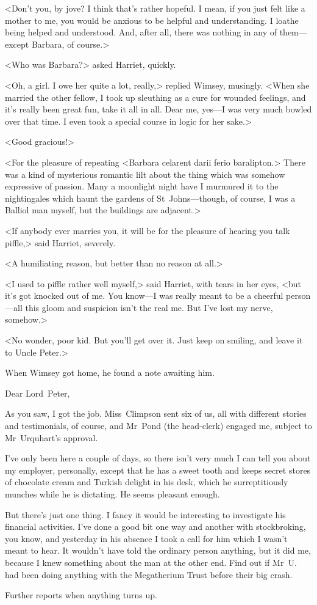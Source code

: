 <Don't you, by jove? I think that's rather hopeful. I mean, if you just felt like a mother to me, you would be anxious to be helpful and understanding. I loathe being helped and understood. And, after all, there was nothing in any of them—except Barbara, of course.>

<Who was Barbara?> asked Harriet, quickly.

<Oh, a girl. I owe her quite a lot, really,> replied Wimsey, musingly. <When she married the other fellow, I took up sleuthing as a cure for wounded feelings, and it's really been great fun, take it all in all. Dear me, yes—I was very much bowled over that time. I even took a special course in logic for her sake.>

<Good gracious!>

<For the pleasure of repeating <Barbara celarent darii ferio baralipton.> There was a kind of mysterious romantic lilt about the thing which was somehow expressive of passion. Many a moonlight night have I murmured it to the nightingales which haunt the gardens of St~Johns—though, of course, I was a Balliol man myself, but the buildings are adjacent.>

<If anybody ever marries you, it will be for the pleasure of hearing you talk piffle,> said Harriet, severely.

<A humiliating reason, but better than no reason at all.>

<I used to piffle rather well myself,> said Harriet, with tears in her eyes, <but it's got knocked out of me. You know—I was really meant to be a cheerful person—all this gloom and suspicion isn't the real me. But I've lost my nerve, somehow.>

<No wonder, poor kid. But you'll get over it. Just keep on smiling, and leave it to Uncle Peter.>

When Wimsey got home, he found a note awaiting him.

\begin{mail}{}{Dear Lord~Peter,}

As you saw, I got the job. Miss~Climpson sent six of us, all with different stories and testimonials, of course, and Mr~Pond (the head-clerk) engaged me, subject to Mr~Urquhart's approval.

I've only been here a couple of days, so there isn't very much I can tell you about my employer, personally, except that he has a sweet tooth and keeps secret stores of chocolate cream and Turkish delight in his desk, which he surreptitiously munches while he is dictating. He seems pleasant enough.

But there's just one thing. I fancy it would be interesting to investigate his financial activities. I've done a good bit one way and another with stockbroking, you know, and yesterday in his absence I took a call for him which I wasn't meant to hear. It wouldn't have told the ordinary person anything, but it did me, because I knew something about the man at the other end. Find out if Mr~U\@. had been doing anything with the Megatherium Trust before their big crash.

Further reports when anything turns up.

\end{mail}

